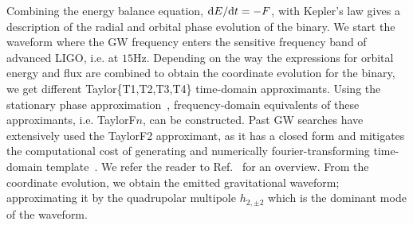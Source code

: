 Combining the energy balance equation, $\mathrm{d} E/\mathrm{d} t = -F$, with Kepler's law 
gives a description of the radial and orbital phase evolution of the binary. 
We start the waveform where the GW frequency enters the sensitive frequency 
band of advanced LIGO, i.e. at $15$Hz. 
Depending on the way the expressions for orbital energy and flux
are combined to obtain the coordinate evolution for the binary,
we get different Taylor\{T1,T2,T3,T4\} time-domain approximants. Using the 
stationary phase approximation~\cite{MatthewsWalker}, frequency-domain 
equivalents of these approximants, i.e. TaylorF$n$, can be constructed. 
Past GW searches have extensively used the TaylorF2 approximant, as it has a
closed form and mitigates the computational cost of generating and numerically
fourier-transforming time-domain template~\cite{Colaboration:2011nz,Abadie:2010yb,
Abbott:2009qj,Abbott:2009tt,Messaritaki:2005wv}.
We refer the reader to Ref.~\cite{PNtheoryLivingReviewBlanchet,JolienGWPhysAst}
for an overview.
From the coordinate evolution, we obtain the emitted gravitational waveform;
approximating it by the quadrupolar multipole $h_{2,\pm 2}$ which is the 
dominant mode of the waveform.


